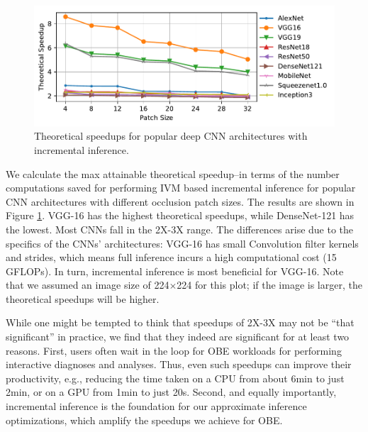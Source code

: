 \documentclass{vldb}
\begin{document}
\begin{figure}
\includegraphics[width=\columnwidth]{images/redundancy_ratio.pdf}
\caption{Theoretical speedups for popular deep CNN architectures with incremental inference.}
\label{fig:theoretical_speedups}
\vspace{-2mm}
\end{figure}

We calculate the max attainable theoretical speedup--in terms of the number computations saved for performing IVM based incremental inference for popular CNN architectures with different occlusion patch sizes.
The results are shown in Figure \ref{fig:theoretical_speedups}.
VGG-16 has the highest theoretical speedups, while DenseNet-121 has the lowest. Most CNNs fall in the 2X-3X range.
The differences arise due to the specifics of the CNNs’ architectures: VGG-16 has small Convolution filter kernels and strides, which means full inference incurs a high computational cost (15 GFLOPs). In turn, incremental inference is most beneficial for VGG-16.
Note that we assumed an image size of 224$\times$224 for this plot; if the image is larger, the theoretical speedups will be higher.

While one might be tempted to think that speedups of 2X-3X may not be ``that significant'' in practice, we find that they indeed are significant for at least two reasons.
First, users often wait in the loop for OBE workloads for performing interactive diagnoses and analyses.
Thus, even such speedups can improve their productivity, e.g., reducing the time taken on a CPU from about 6min to just 2min, or on a GPU from
1min to just 20s.
Second, and equally importantly, incremental inference is the foundation for our approximate inference optimizations, which amplify the speedups we achieve for OBE.
\end{document}
